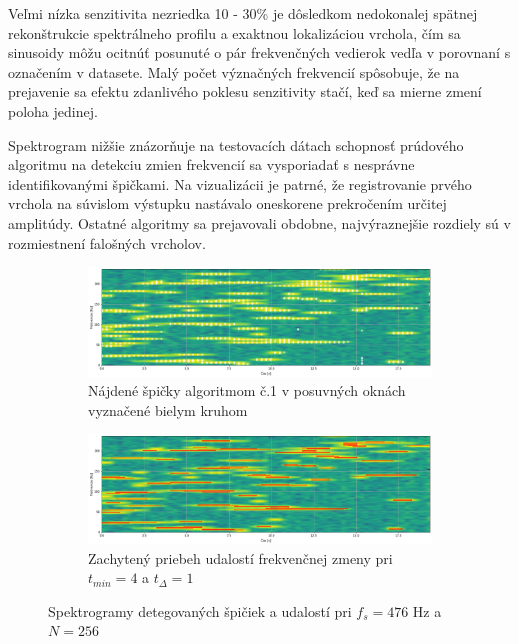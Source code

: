 Veľmi nízka senzitivita nezriedka 10 - 30\% je dôsledkom nedokonalej spätnej rekonštrukcie spektrálneho profilu a exaktnou
lokalizáciou vrchola, čím sa sinusoidy môžu ocitnúť posunuté o pár frekvenčných vedierok vedľa v porovnaní s označením v datasete.
Malý počet význačných frekvencií spôsobuje, že na prejavenie sa efektu zdanlivého poklesu senzitivity stačí, keď sa
mierne zmení poloha jedinej.

Spektrogram nižšie znázorňuje na testovacích dátach schopnosť prúdového algoritmu na detekciu zmien
frekvencií sa vysporiadať s nesprávne identifikovanými špičkami. Na vizualizácii je patrné, že
registrovanie prvého vrchola na súvislom výstupku nastávalo oneskorene prekročením určitej amplitúdy.
Ostatné algoritmy sa prejavovali obdobne, najvýraznejšie rozdiely sú v rozmiestnení falošných vrcholov.

\begin{figure}[h]
	\centering
     \begin{subfigure}{\textwidth}
        \centering
     	\includegraphics[width=\textwidth]{figures/verification/Sythetic-FFT-A1-476-256.png}
     	\caption{Nájdené špičky algoritmom č.1 v posuvných oknách vyznačené bielym kruhom}
     \end{subfigure}
     \begin{subfigure}{\textwidth}
    	\centering
    	\includegraphics[width=\textwidth]{figures/verification/Sythetic-A1-events.png}
   		\caption{Zachytený priebeh udalostí frekvenčnej zmeny pri $t_{min} = 4$ a $t_{\Delta} = 1$}
     \end{subfigure}
     \caption{Spektrogramy detegovaných špičiek a udalostí pri $f_s = 476$ Hz a $N = 256$}
\end{figure}

